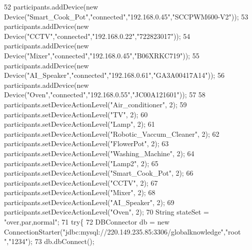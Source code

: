 \begin{DoxyCode}
52         participants.addDevice(\textcolor{keyword}{new} Device(\textcolor{stringliteral}{"Smart\_Cook\_Pot"},\textcolor{stringliteral}{"connected"},\textcolor{stringliteral}{"192.168.0.45"},\textcolor{stringliteral}{"SCCPWM600-V2"}));
53         participants.addDevice(\textcolor{keyword}{new} Device(\textcolor{stringliteral}{"CCTV"},\textcolor{stringliteral}{"connected"},\textcolor{stringliteral}{"192.168.0.22"},\textcolor{stringliteral}{"722823017"}));
54         participants.addDevice(\textcolor{keyword}{new} Device(\textcolor{stringliteral}{"Mixer"},\textcolor{stringliteral}{"connected"},\textcolor{stringliteral}{"192.168.0.45"},\textcolor{stringliteral}{"B06XRKC719"}));
55         participants.addDevice(\textcolor{keyword}{new} Device(\textcolor{stringliteral}{"AI\_Speaker"},\textcolor{stringliteral}{"connected"},\textcolor{stringliteral}{"192.168.0.61"},\textcolor{stringliteral}{"GA3A00417A14"}));
56         participants.addDevice(\textcolor{keyword}{new} Device(\textcolor{stringliteral}{"Oven"},\textcolor{stringliteral}{"connected"},\textcolor{stringliteral}{"192.168.0.55"},\textcolor{stringliteral}{"JC00A121601"}));
57         
58         participants.setDeviceActionLevel(\textcolor{stringliteral}{"Air\_conditioner"}, 2);
59         participants.setDeviceActionLevel(\textcolor{stringliteral}{"TV"}, 2);
60         participants.setDeviceActionLevel(\textcolor{stringliteral}{"Lamp"}, 2);
61         participants.setDeviceActionLevel(\textcolor{stringliteral}{"Robotic\_Vaccum\_Cleaner"}, 2);
62         participants.setDeviceActionLevel(\textcolor{stringliteral}{"FlowerPot"}, 2);
63         participants.setDeviceActionLevel(\textcolor{stringliteral}{"Washing\_Machine"}, 2);
64         participants.setDeviceActionLevel(\textcolor{stringliteral}{"Lamp2"}, 2);
65         participants.setDeviceActionLevel(\textcolor{stringliteral}{"Smart\_Cook\_Pot"}, 2);
66         participants.setDeviceActionLevel(\textcolor{stringliteral}{"CCTV"}, 2);
67         participants.setDeviceActionLevel(\textcolor{stringliteral}{"Mixer"}, 2);
68         participants.setDeviceActionLevel(\textcolor{stringliteral}{"AI\_Speaker"}, 2);
69         participants.setDeviceActionLevel(\textcolor{stringliteral}{"Oven"}, 2);
70         String stateSet = \textcolor{stringliteral}{"over,par,normal"};
71         \textcolor{keywordflow}{try}\{
72             DBConnector db = \textcolor{keyword}{new} ConnectionStarter(\textcolor{stringliteral}{"jdbc:mysql://220.149.235.85:3306/globalknowledge"},\textcolor{stringliteral}{"root
      "},\textcolor{stringliteral}{"1234"});
73             db.dbConnect();

\end{DoxyCode}
